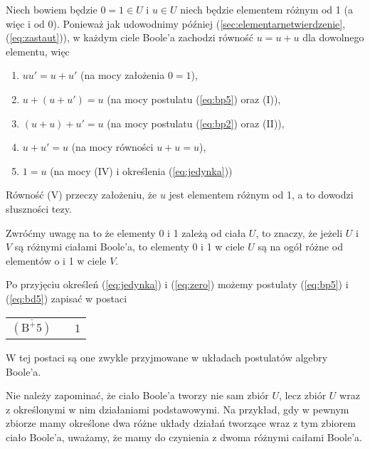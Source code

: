\documentclass[12 pt, a4paper, leqno]{book}
\numberwithin{equation}{section}
\newcommand{\refb}[1]{(\ref{#1})}
\begin{document}
 Niech bowiem będzie $0 = 1 \in U$ i $u \in U$ niech będzie elementem różnym od 1 (a więc i od 0).
 Ponieważ jak udowodnimy później (\ref{sec:elementarnetwierdzenie}, \refb{eq:zastaut}), w każdym ciele 
 Boole'a zachodzi równość $u=u+u$ dla dowolnego elementu, więc
\begin{enumerate}[label=(\Roman*), labelsep=2em]
  \item $uu' = u + u'$ (na mocy założenia $0=1$), 
  \item $u+(u+u')=u$ (na mocy postulatu \refb{eq:bp5} oraz (\RN{1})),
  \item $(u+u)+u'=u$ (na mocy postulatu \refb{eq:bp2} oraz (\RN{2})),
  \item $u+u'=u$ (na mocy równości $u+u=u$),
  \item $1=u$ (na mocy (\RN{4}) i określenia \refb{eq:jedynka})
\end{enumerate}

Równość (\RN{5}) przeczy założeniu, że $u$ jest elementem różnym od 1, a to dowodzi słuszności tezy.

Zwróćmy uwagę na to że elementy 0 i 1 zależą od ciała $U$, to znaczy, że jeżeli $U$ i $V$ są różnymi ciałami
Boole'a, to elementy 0 i 1 w ciele $U$ są na ogół różne od elementów o i 1 w ciele $V$.

Po przyjęciu określeń \refb{eq:jedynka} i \refb{eq:zero} możemy postulaty \refb{eq:bp5} i
\refb{eq:bd5} zapisać w postaci

\noindent
\begin{tabular}{p{} >{\raggedleft}p{} >{\raggedright}p{}}
$\overline{(\mbox{B}^+5)}$ & 8 & 1
\end{tabular}

W tej postaci są one zwykle przyjmowane w układach postulatów algebry Boole'a.

Nie należy zapominać, że ciało Boole'a tworzy nie sam zbiór $U$, lecz zbiór $U$ wraz z określonymi 
w nim działaniami podstawowymi. Na przykład, gdy w pewnym zbiorze mamy określone dwa różne układy działań tworzące 
wraz z tym zbiorem ciało Boole'a, uważamy, że mamy do czynienia z dwoma różnymi caiłami Boole'a.
\end{document}
